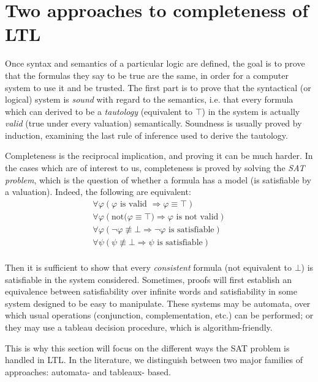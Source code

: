 \documentclass[11pt]{article}
\newcommand{\phii}{{\varphi}}
\theoremstyle{definition}
\begin{document}
\section{Two approaches to completeness of LTL}\label{SecLTLcomp}
 
Once syntax and semantics of a particular logic are defined, the goal is to prove that the formulas they say to be true are the same,
in order for a computer system to use it and be trusted. The first part is to prove that the syntactical (or logical) system is \emph{sound}
with regard to the semantics, i.e. that every formula which can derived to be a \emph{tautology} (equivalent to $\top$) in the system is actually \emph{valid}
(true under every valuation) semantically. Soundness is usually proved by induction, examining the last rule of inference used to derive the tautology.

Completeness is the reciprocal implication, and proving it can be much harder. In the cases which are of interest to us, completeness is proved by solving the 
\emph{SAT problem}, which is the question of whether a formula has a model (is satisfiable by a valuation). Indeed, the following are equivalent:
\begin{equation*}
    \begin{gathered}
        \forall\phii (\phii\mbox{ is valid }\Rightarrow \phii\equiv\top)\\
        \forall\phii (\mbox{not(}\phii\equiv\top\mbox{)}\Rightarrow \phii\mbox{ is not valid})\\
        \forall\phii (\neg\phii\not\equiv\bot\Rightarrow \neg\phii\mbox{ is satisfiable})\\
        \forall\psi (\psi\not\equiv\bot\Rightarrow \psi\mbox{ is satisfiable}) \\
    \end{gathered}
\end{equation*}
 
Then it is sufficient to show that every \emph{consistent} formula (not equivalent to $\bot$) is satisfiable in the 
system considered. Sometimes, proofs will first establish an equivalence between satisfiability over infinite words and
satisfiability in some system designed to be easy to manipulate. These systems may be automata, over which
usual operations (conjunction, complementation, etc.) can be performed; or they may use a tableau decision procedure,
which is algorithm-friendly.

This is why this section will focus on the different ways the SAT problem is handled in LTL. In the literature, we distinguish between two
major families of approaches: automata- and tableaux- based. 
\end{document}
